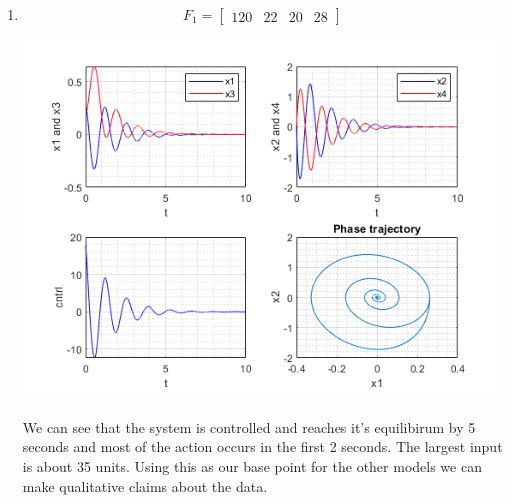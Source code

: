 \documentclass{article}
\begin{document}
\begin{enumerate}[1)]
\item $$ F_1 = \begin{bmatrix} 120 & 22 & 20 & 28 \end{bmatrix} $$
\begin{minipage}{\linewidth}
\centering
\includegraphics[scale=.8]{images/p2-1.png}
\end{minipage}
We can see that the system is controlled and reaches it's equilibirum by 5 seconds and most of the action occurs in the first 2 seconds.
The largest input is about 35 units.
Using this as our base point for the other models we can make qualitative claims about the data.


\end{enumerate}
\end{document}
